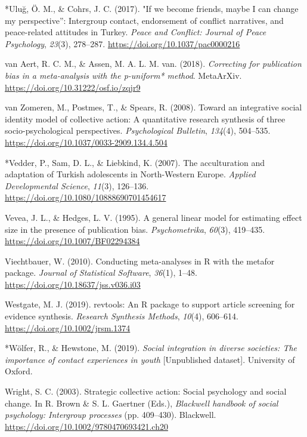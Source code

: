 \documentclass[12pt, letterpaper]{article}
\begin{document}
\leavevmode\hypertarget{ref-286}{}%
*Uluğ, Ö. M., \& Cohrs, J. C. (2017). "If we become friends, maybe I can
change my perspective'': Intergroup contact, endorsement of conflict
narratives, and peace-related attitudes in Turkey. \emph{Peace and
Conflict: Journal of Peace Psychology}, \emph{23}(3), 278--287.
\url{https://doi.org/10.1037/pac0000216}

\leavevmode\hypertarget{ref-van_aert_correcting_2018}{}%
van Aert, R. C. M., \& Assen, M. A. L. M. van. (2018). \emph{Correcting
for publication bias in a meta-analysis with the p-uniform* method}.
MetaArXiv. \url{https://doi.org/10.31222/osf.io/zqjr9}

\leavevmode\hypertarget{ref-van_zomeren_toward_2008}{}%
van Zomeren, M., Postmes, T., \& Spears, R. (2008). Toward an
integrative social identity model of collective action: A quantitative
research synthesis of three socio-psychological perspectives.
\emph{Psychological Bulletin}, \emph{134}(4), 504--535.
\url{https://doi.org/10.1037/0033-2909.134.4.504}

\leavevmode\hypertarget{ref-829}{}%
*Vedder, P., Sam, D. L., \& Liebkind, K. (2007). The acculturation and
adaptation of Turkish adolescents in North-Western Europe. \emph{Applied
Developmental Science}, \emph{11}(3), 126--136.
\url{https://doi.org/10.1080/10888690701454617}

\leavevmode\hypertarget{ref-vevea_general_1995}{}%
Vevea, J. L., \& Hedges, L. V. (1995). A general linear model for
estimating effect size in the presence of publication bias.
\emph{Psychometrika}, \emph{60}(3), 419--435.
\url{https://doi.org/10.1007/BF02294384}

\leavevmode\hypertarget{ref-viechtbauer_conducting_2010}{}%
Viechtbauer, W. (2010). Conducting meta-analyses in R with the metafor
package. \emph{Journal of Statistical Software}, \emph{36}(1), 1--48.
\url{https://doi.org/10.18637/jss.v036.i03}

\leavevmode\hypertarget{ref-westgate_revtools:_2019}{}%
Westgate, M. J. (2019). revtools: An R package to support article
screening for evidence synthesis. \emph{Research Synthesis Methods},
\emph{10}(4), 606--614. \url{https://doi.org/10.1002/jrsm.1374}

\leavevmode\hypertarget{ref-2383}{}%
*Wölfer, R., \& Hewstone, M. (2019). \emph{Social integration in diverse
societies: The importance of contact experiences in youth}
{[}Unpublished dataset{]}. University of Oxford.

\leavevmode\hypertarget{ref-brown_strategic_2003}{}%
Wright, S. C. (2003). Strategic collective action: Social psychology and
social change. In R. Brown \& S. L. Gaertner (Eds.), \emph{Blackwell
handbook of social psychology: Intergroup processes} (pp. 409--430).
Blackwell. \url{https://doi.org/10.1002/9780470693421.ch20}
\end{document}
